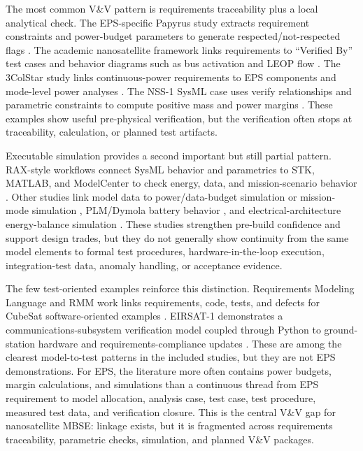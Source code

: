 The most common V\&V pattern is requirements traceability plus a local analytical check.  The EPS-specific Papyrus study extracts requirement constraints and power-budget parameters to generate respected/not-respected flags \cite{paper-0026}.  The academic nanosatellite framework links requirements to ``Verified By'' test cases and behavior diagrams such as bus activation and LEOP flow \cite{paper-0023}.  The 3ColStar study links continuous-power requirements to EPS components and mode-level power analyses \cite{paper-0078}.  The NSS-1 SysML case uses verify relationships and parametric constraints to compute positive mass and power margins \cite{paper-0080}.  These examples show useful pre-physical verification, but the verification often stops at traceability, calculation, or planned test artifacts.

Executable simulation provides a second important but still partial pattern.  RAX-style workflows connect SysML behavior and parametrics to STK, MATLAB, and ModelCenter to check energy, data, and mission-scenario behavior \cite{paper-0001,paper-0003}.  Other studies link model data to power/data-budget simulation or mission-mode simulation \cite{paper-0027,paper-0029,paper-0033,paper-0043}, PLM/Dymola battery behavior \cite{paper-0059}, and electrical-architecture energy-balance simulation \cite{paper-0053}.  These studies strengthen pre-build confidence and support design trades, but they do not generally show continuity from the same model elements to formal test procedures, hardware-in-the-loop execution, integration-test data, anomaly handling, or acceptance evidence.

The few test-oriented examples reinforce this distinction.  Requirements Modeling Language and RMM work links requirements, code, tests, and defects for CubeSat software-oriented examples \cite{paper-0034}.  EIRSAT-1 demonstrates a communications-subsystem verification model coupled through Python to ground-station hardware and requirements-compliance updates \cite{paper-0063}.  These are among the clearest model-to-test patterns in the included studies, but they are not EPS demonstrations.  For EPS, the literature more often contains power budgets, margin calculations, and simulations than a continuous thread from EPS requirement to model allocation, analysis case, test case, test procedure, measured test data, and verification closure.  This is the central V\&V gap for nanosatellite MBSE: linkage exists, but it is fragmented across requirements traceability, parametric checks, simulation, and planned V\&V packages.


